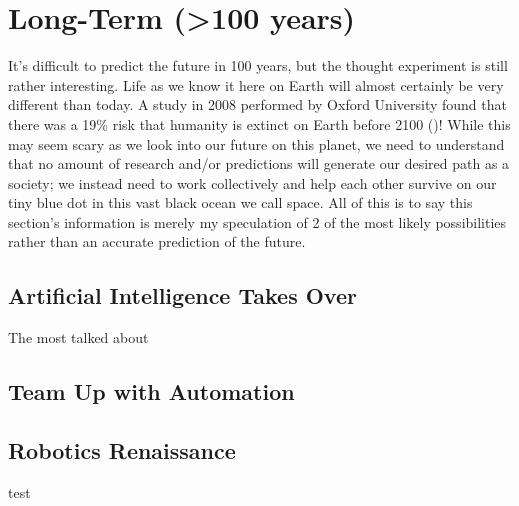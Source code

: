 \section{Long-Term (>100 years)}
\label{sec:long}

It's difficult to predict the future in 100 years, but the thought experiment is still rather interesting. Life as we know it here on Earth will almost certainly be very different than today. A study in 2008 performed by Oxford University found that there was a 19\% risk that humanity is extinct on Earth before 2100 (\cite{WeDead100Years})! While this may seem scary as we look into our future on this planet, we need to understand that no amount of research and/or predictions will generate our desired path as a society; we instead need to work collectively and help each other survive on our tiny blue dot in this vast black ocean we call space. All of this is to say this section's information is merely my speculation of 2 of the most likely possibilities rather than an accurate prediction of the future.

\subsection{Artificial Intelligence Takes Over}

The most talked about 

\subsection{Team Up with Automation}

\subsection{Robotics Renaissance}
test